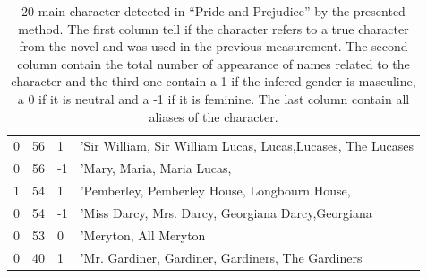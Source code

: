 \documentclass[a4paper, 12pt]{report}
\begin{document}
\begin{table}[]
{\begin{tabular}{llll}
0  & 56  & 1  & 'Sir William, Sir William Lucas, Lucas,Lucases, The Lucases\\
0  & 56  & -1 & 'Mary, Maria, Maria Lucas,                                       \\
1  & 54  & 1  & 'Pemberley, Pemberley House, Longbourn House,                    \\
0  & 54  & -1 & 'Miss Darcy, Mrs. Darcy, Georgiana Darcy,Georgiana              \\
0  & 53  & 0  & 'Meryton, All Meryton                                     \\
0  & 40  & 1  & 'Mr. Gardiner, Gardiner, Gardiners, The Gardiners                \\
\end{tabular}
}
\caption{20 main character detected in ``Pride and Prejudice'' by the presented method. The first column tell if the character refers to a true character from the novel and was used in the previous measurement. The second column contain the total number of appearance of names related to the character and the third one contain a 1 if the infered gender is masculine, a 0 if it is neutral and a -1 if it is feminine. The last column contain all aliases of the character. }


\end{table}
\end{document}
